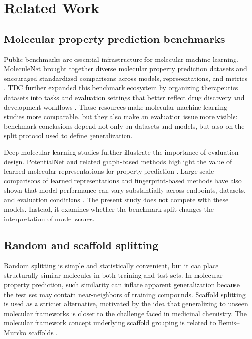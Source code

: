 \section{Related Work}

\subsection{Molecular property prediction benchmarks}

Public benchmarks are essential infrastructure for molecular machine learning. MoleculeNet brought together diverse molecular property prediction datasets and encouraged standardized comparisons across models, representations, and metrics \citep{wu2018moleculenet}. TDC further expanded this benchmark ecosystem by organizing therapeutics datasets into tasks and evaluation settings that better reflect drug discovery and development workflows \citep{huang2021tdc}. These resources make molecular machine-learning studies more comparable, but they also make an evaluation issue more visible: benchmark conclusions depend not only on datasets and models, but also on the split protocol used to define generalization.

Deep molecular learning studies further illustrate the importance of evaluation design. PotentialNet and related graph-based methods highlight the value of learned molecular representations for property prediction \citep{feinberg2018potentialnet}. Large-scale comparisons of learned representations and fingerprint-based methods have also shown that model performance can vary substantially across endpoints, datasets, and evaluation conditions \citep{yang2019learned}. The present study does not compete with these models. Instead, it examines whether the benchmark split changes the interpretation of model scores.

\subsection{Random and scaffold splitting}

Random splitting is simple and statistically convenient, but it can place structurally similar molecules in both training and test sets. In molecular property prediction, such similarity can inflate apparent generalization because the test set may contain near-neighbors of training compounds. Scaffold splitting is used as a stricter alternative, motivated by the idea that generalizing to unseen molecular frameworks is closer to the challenge faced in medicinal chemistry. The molecular framework concept underlying scaffold grouping is related to Bemis--Murcko scaffolds \citep{bemis1996properties}.

